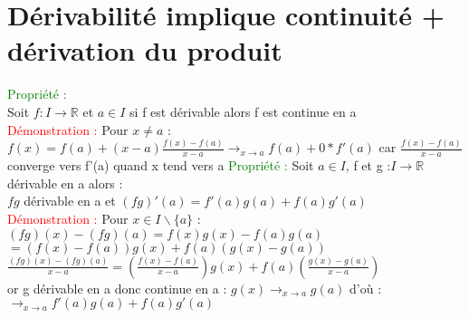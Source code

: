 \documentclass{article}
\begin{document}
\section{Dérivabilité implique continuité + dérivation du produit}
\textcolor{green}{Propriété :} \\ 
Soit $f: I \rightarrow \mathbb{R}$ et $a \in I$ si f est dérivable alors f est continue en a \\ 
\textcolor{red}{Démonstration :} Pour $x \neq a$ : \\ 
$f(x)=f(a)+(x-a) \frac{f(x)-f(a)}{x-a} \rightarrow_{x \rightarrow a} f(a)+ 0* f'(a)$ car $\frac{f(x)-f(a)}{x-a}$ converge vers f'(a) quand x tend vers a
\textcolor{green}{Propriété :} Soit $a \in I$, f et g :$I \rightarrow \mathbb{R}$ dérivable en a alors : \\ 
$fg$ dérivable en a  et $(fg)'(a)=f'(a)g(a)+f(a)g'(a)$ \\ 
\textcolor{red}{Démonstration :} Pour $x \in I \backslash \lbrace a \rbrace$ : \\ 
$(fg)(x)-(fg)(a)=f(x)g(x)-f(a)g(a)$ \\ 
\indent $=(f(x)-f(a))g(x)+f(a)(g(x)-g(a))$ \\ 
$\frac{(fg)(x)-(fg)(a)}{x-a}=(\frac{f(x)-f(a)}{x-a})g(x)+f(a)(\frac{g(x)-g(a)}{x-a})$ \\ 
or g dérivable en a donc continue en a : $g(x) \rightarrow_{x\rightarrow a} g(a)$ d'où : \\ 
$\rightarrow_{x \rightarrow a} f'(a)g(a)+f(a)g'(a)$
\end{document}
